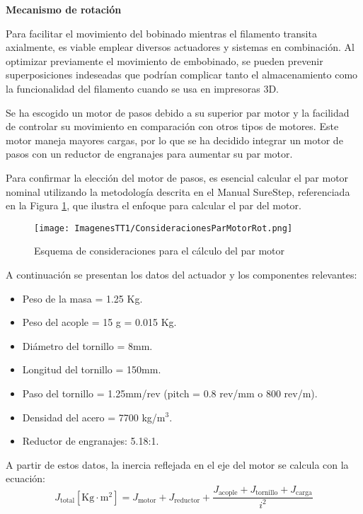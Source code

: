 \documentclass[14pt,oneside]{extarticle} %
\begin{document}
\textbf{Mecanismo de rotación}

Para facilitar el movimiento del bobinado mientras el filamento transita axialmente, es viable emplear diversos actuadores y sistemas en combinación. Al optimizar previamente el movimiento de embobinado, se pueden prevenir superposiciones indeseadas que podrían complicar tanto el almacenamiento como la funcionalidad del filamento cuando se usa en impresoras 3D.

Se ha escogido un motor de pasos debido a su superior par motor y la facilidad de controlar su movimiento en comparación con otros tipos de motores. Este motor maneja mayores cargas, por lo que se ha decidido integrar un motor de pasos con un reductor de engranajes para aumentar su par motor.

Para confirmar la elección del motor de pasos, es esencial calcular el par motor nominal utilizando la metodología descrita en el Manual SureStep, referenciada en la Figura \ref{fig:ConsideracionesParMotorRot}, que ilustra el enfoque para calcular el par del motor.


\begin{figure}[H]
    \centering
    \texttt{[image: ImagenesTT1/ConsideracionesParMotorRot.png]}
    \caption{Esquema de consideraciones para el cálculo del par motor \cite{extrusoraPLA}}
    \label{fig:ConsideracionesParMotorRot}
\end{figure}
A continuación se presentan los datos del actuador y los componentes relevantes:
\begin{itemize}
    \item Peso de la masa = 1.25 Kg.
    \item Peso del acople = 15 g = 0.015 Kg.
    \item Diámetro del tornillo = 8mm.
    \item Longitud del tornillo = 150mm.
    \item Paso del tornillo = 1.25mm/rev (pitch = 0.8 rev/mm o 800 rev/m).
    \item Densidad del acero = 7700 kg/m$^3$.
    \item Reductor de engranajes: 5.18:1.
\end{itemize}

A partir de estos datos, la inercia reflejada en el eje del motor se calcula con la ecuación:
\begin{equation}
J_{\text{total}} [\text{Kg} \cdot \text{m}^2] = J_{\text{motor}} + J_{\text{reductor}} + \frac{J_{\text{acople}} + J_{\text{tornillo}} + J_{\text{carga}}}{i^2}
\label{eq:inertia_total}
\end{equation}
\end{document}
